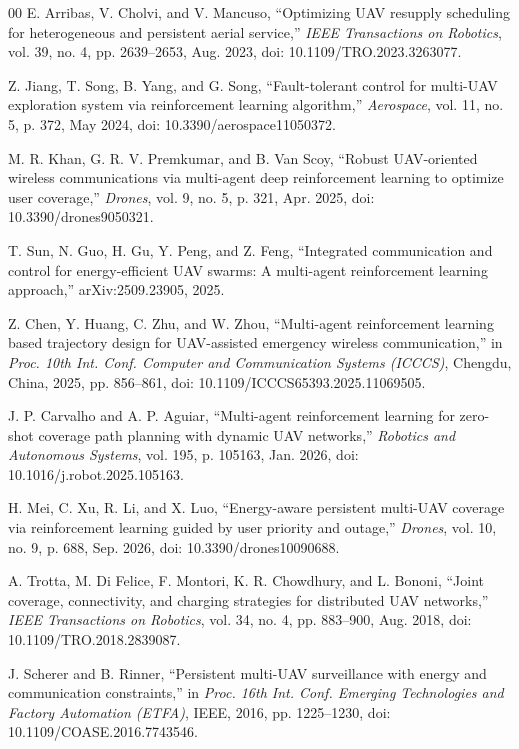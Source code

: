 \documentclass[conference]{IEEEtran}
\begin{document}
\begin{thebibliography}{00}
E. Arribas, V. Cholvi, and V. Mancuso, ``Optimizing UAV resupply scheduling for heterogeneous and persistent aerial service,'' \emph{IEEE Transactions on Robotics}, vol. 39, no. 4, pp. 2639--2653, Aug. 2023, doi: 10.1109/TRO.2023.3263077.

Z. Jiang, T. Song, B. Yang, and G. Song, ``Fault-tolerant control for multi-UAV exploration system via reinforcement learning algorithm,'' \emph{Aerospace}, vol. 11, no. 5, p. 372, May 2024, doi: 10.3390/aerospace11050372.

M. R. Khan, G. R. V. Premkumar, and B. Van Scoy, ``Robust UAV-oriented wireless communications via multi-agent deep reinforcement learning to optimize user coverage,'' \emph{Drones}, vol. 9, no. 5, p. 321, Apr. 2025, doi: 10.3390/drones9050321.

T. Sun, N. Guo, H. Gu, Y. Peng, and Z. Feng, ``Integrated communication and control for energy-efficient UAV swarms: A multi-agent reinforcement learning approach,'' arXiv:2509.23905, 2025.

Z. Chen, Y. Huang, C. Zhu, and W. Zhou, ``Multi-agent reinforcement learning based trajectory design for UAV-assisted emergency wireless communication,'' in \emph{Proc. 10th Int. Conf. Computer and Communication Systems (ICCCS)}, Chengdu, China, 2025, pp. 856--861, doi: 10.1109/ICCCS65393.2025.11069505.

J. P. Carvalho and A. P. Aguiar, ``Multi-agent reinforcement learning for zero-shot coverage path planning with dynamic UAV networks,'' \emph{Robotics and Autonomous Systems}, vol. 195, p. 105163, Jan. 2026, doi: 10.1016/j.robot.2025.105163.

H. Mei, C. Xu, R. Li, and X. Luo, ``Energy-aware persistent multi-UAV coverage via reinforcement learning guided by user priority and outage,'' \emph{Drones}, vol. 10, no. 9, p. 688, Sep. 2026, doi: 10.3390/drones10090688.

A. Trotta, M. Di Felice, F. Montori, K. R. Chowdhury, and L. Bononi, ``Joint coverage, connectivity, and charging strategies for distributed UAV networks,'' \emph{IEEE Transactions on Robotics}, vol. 34, no. 4, pp. 883--900, Aug. 2018, doi: 10.1109/TRO.2018.2839087.

J. Scherer and B. Rinner, ``Persistent multi-UAV surveillance with energy and communication constraints,'' in \emph{Proc. 16th Int. Conf. Emerging Technologies and Factory Automation (ETFA)}, IEEE, 2016, pp. 1225--1230, doi: 10.1109/COASE.2016.7743546.


\end{thebibliography}
\end{document}
